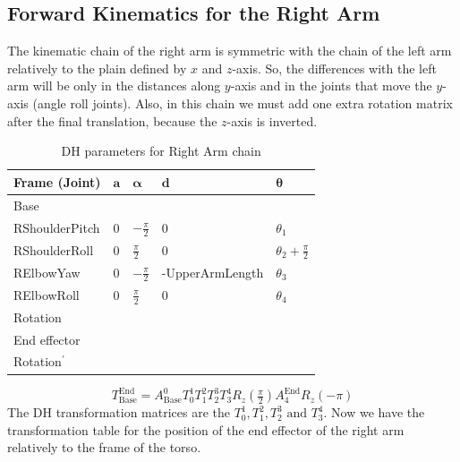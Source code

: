\subsection{Forward Kinematics for the Right Arm}
The kinematic chain of the right arm is symmetric with the chain of the left arm relatively to the plain defined by \(x\) and \(z\)-axis. So, the differences with the left arm will be only in the distances along \(y\)-axis and in the joints that move the \(y\)-axis (angle roll joints). Also, in this chain we must add one extra rotation matrix after the final translation, because the \(z\)-axis is inverted.
\begin{table}[!h]
\centering
\begin{tabular}{|l|>{\centering\arraybackslash}m{2.55cm}|>{\centering\arraybackslash}m{2.55cm}|>{\centering\arraybackslash}m{2.55cm}|>{\centering\arraybackslash}m{2.55cm}|}
\hline
\textbf{Frame (Joint)} & \(\mathbf{a}\) & \(\boldsymbol{\alpha}\) & \(\mathbf{d}\) & \(\boldsymbol{\theta}\)\\ \hline
Base & \multicolumn{4}{|c|}{\(A(0,\text{\footnotesize{-ShoulderOffsetY - ElbowOffsetY}},\text{\footnotesize{ShoulderOffsetZ}})\)} \\ \hline
RShoulderPitch & \(0\) & \(-\frac{\pi}{2}\) & \(0\) & \(\theta_1\) \\ \hline
RShoulderRoll & \(0\) & \(\frac{\pi}{2}\) & \(0\) & \(\theta_2 + \frac{\pi}{2}\) \\ \hline
RElbowYaw & \(0\) & \(-\frac{\pi}{2}\) & \footnotesize{-UpperArmLength} & \(\theta_3\) \\ \hline
RElbowRoll & \(0\) & \(\frac{\pi}{2}\) & \(0\) & \(\theta_4\) \\ \hline
Rotation & \multicolumn{4}{c|}{\(R_z(\frac{\pi}{2})\)} \\ \hline
End effector & \multicolumn{4}{c|}{\(A(\text{\footnotesize{-HandOffsetX-LowerArmLength}},0,0)\)} \\ \hline
Rotation$^{'}$ & \multicolumn{4}{c|}{\(R_z(-\pi)\)} \\ \hline
\end{tabular}
\caption{DH parameters for Right Arm chain}
\label{tab:DH parameters for Right Arm chain}
\end{table}
\[
T^\text{End}_\text{Base} = A^0_\text{Base}T^1_0T^2_1T^3_2T^4_3R_z(\tfrac{\pi}{2})A^\text{End}_{4}R_z(-\pi)
\]
The DH transformation matrices are the \(T^1_0,T^2_1,T^3_2\text{ and }T^4_3\). Now we have the transformation table for the position of the end effector of the right arm relatively to the frame of the torso.

